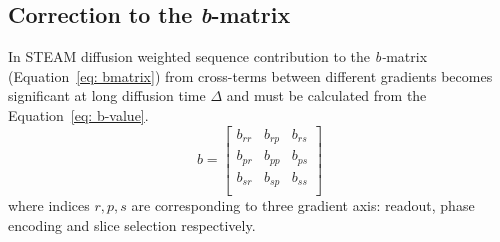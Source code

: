 \subsection{Correction to the \textit{b}-matrix}
\label{subsection: STEAM b value}
In STEAM diffusion weighted sequence contribution to the \textit{b-}matrix (Equation~\ref{eq: bmatrix}) from cross-terms between different gradients becomes significant at long diffusion time $\Delta$ and must be calculated from the Equation~\ref{eq: b-value}. 
\begin{equation}\label{eq: bmatrix}
b =\left[
\begin{array}{ccc}
b_{rr} & b_{rp} & b_{rs} \\
b_{pr} & b_{pp} & b_{ps} \\[1pt]
b_{sr} & b_{sp} & b_{ss} \\
\end{array}\right]
\end{equation}
where indices $r, p, s$ are corresponding to three gradient axis: readout, phase encoding and slice selection respectively. 

